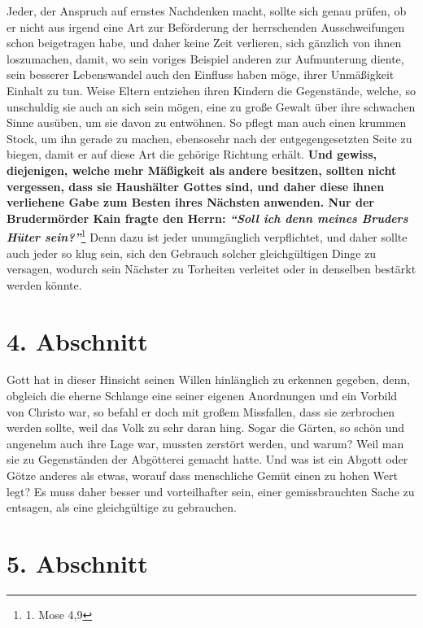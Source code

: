 Jeder, der Anspruch auf ernstes Nachdenken macht, sollte sich genau prüfen, ob
er nicht aus irgend eine Art zur Beförderung der herrschenden Ausschweifungen
schon beigetragen habe, und daher keine Zeit verlieren, sich gänzlich von ihnen
loszumachen, damit, wo sein voriges Beispiel anderen zur Aufmunterung
diente, sein besserer Lebenswandel auch den Einfluss haben möge, ihrer
Unmäßigkeit Einhalt zu tun. Weise
Eltern
entziehen ihren Kindern die
Gegenstände, welche, so unschuldig sie auch an sich sein mögen, eine zu große
Gewalt über ihre schwachen Sinne ausüben, um sie davon zu entwöhnen. So pflegt
man auch einen krummen Stock, um ihn gerade zu machen, ebensosehr nach der
entgegengesetzten Seite zu biegen, damit er auf diese Art die gehörige Richtung
erhält.  \label{ref:18_03_vorbild}\textbf{Und gewiss,
diejenigen, welche mehr
Mäßigkeit als andere besitzen,
sollten nicht vergessen, dass sie Haushälter Gottes sind, und daher diese ihnen
verliehene Gabe zum Besten ihres Nächsten anwenden. Nur der Brudermörder
Kain
fragte den Herrn:
\textit{"`Soll ich denn meines Bruders Hüter sein?"'}}\footnote{1. Mose 4,9}
Denn dazu ist jeder unumgänglich verpflichtet, und daher sollte auch jeder
so klug sein, sich den Gebrauch solcher gleichgültigen Dinge zu versagen,
wodurch sein Nächster zu Torheiten verleitet oder in denselben bestärkt werden
könnte.

\section{4. Abschnitt} \label{kap18_ab4}

Gott hat in dieser Hinsicht seinen Willen hinlänglich zu erkennen gegeben, denn,
obgleich die eherne Schlange eine seiner eigenen Anordnungen und
ein Vorbild von
Christo war, so befahl er doch mit großem Missfallen, dass sie zerbrochen werden
sollte, weil das Volk zu sehr daran hing. Sogar die Gärten, so schön und
angenehm
auch ihre Lage war, mussten zerstört werden, und warum? Weil man sie zu
Gegenständen der Abgötterei gemacht hatte. Und was ist
ein
Abgott oder Götze
anderes als etwas, worauf dass menschliche Gemüt einen zu hohen Wert legt? Es
muss daher besser und vorteilhafter sein, einer gemissbrauchten Sache zu
entsagen, als eine gleichgültige zu gebrauchen.

\section{5. Abschnitt} \label{kap18_ab5}

